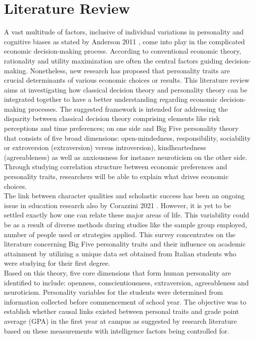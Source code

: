 \documentclass[12pt,a4paper]{article}
\begin{document}
{\section{Literature Review}
A vast multitude of factors, inclusive of individual variations in personality and cognitive biases as stated by Anderson 2011 \cite{anderson}, come into play in the complicated economic decision-making process. According to conventional economic theory, rationality and utility maximization are often the central factors guiding decision-making. Nonetheless, new research has proposed that personality traits are crucial determinants of various economic choices or results. This literature review aims at investigating how classical decision theory and personality theory can be integrated together to have a better understanding regarding economic decision-making processes. The suggested framework is intended for addressing the disparity between classical decision theory comprising elements like risk perceptions and time preferences; on one side and Big Five personality theory that consists of five broad dimensions: open-mindedness, responsibility, sociability or extroversion (extraversion) versus introversion), kindheartedness (agreeableness) as well as anxiousness for instance neuroticism on the other side. Through studying correlation structure between economic preferences and personality traits, researchers will be able to explain what drives economic choices.\\
The link between character qualities and scholastic success has been an ongoing issue in education research also by Corazzini 2021 \cite{corazzini2021}. However, it is yet to be settled exactly how one can relate these major areas of life. This variability could be as a result of diverse methods during studies like the sample group employed, number of people used or strategies applied. This survey concentrates on the literature concerning Big Five personality traits and their influence on academic attainment by utilizing a unique data set obtained from Italian students who were studying for their first degree.\\
Based on this theory, five core dimensions that form human personality are identified to include: openness, conscientiousness, extraversion, agreeableness and neuroticism. Personality variables for the students were determined from information collected before commencement of school year. The objective was to establish whether causal links existed between personal traits and grade point average (GPA) in the first year at campus as suggested by research literature based on these measurements with intelligence factors being controlled for.\\
}
\end{document}
